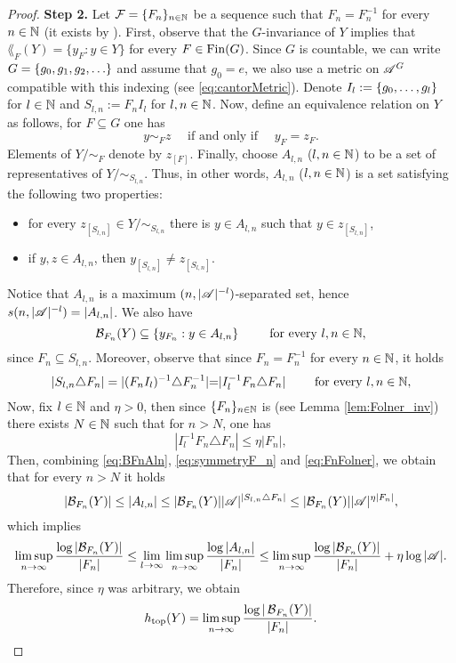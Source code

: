 \begin{proof}
\noindent
{\bf Step 2.}
Let $\operatorname{\mathcal{F}}= \{F_n\}_{n\in\mathbb{N}}$ be a \Folner sequence such that $F_n = F_n^{-1}$ for every $n\in\mathbb{N}$ (it exists by \cite{Namioka64}).
First, observe that the $G$-invariance of $Y$ implies that $\lang_{F}(Y)=\{y_{F}:y\in Y\}$ for every $F\in\operatorname{Fin}(G)$. 
Since $G$ is countable, we can write $G=\left\{g_0,g_1,g_2,\ldots\right\}$ and assume that $g_0=e$, we also use a metric on $\mathscr{A}^G$ compatible with this indexing (see \eqref{eq:cantorMetric}). Denote $I_l:=\left\{g_0,\ldots, g_l\right\}$ for $l\in\mathbb{N}$ and $S_{l,n} := F_nI_l$ for $l,n\in\mathbb{N}$. %
Now, define an equivalence relation on $Y$ as follows, for $F\subseteq G$ one has
\[
y\sim_F z \quad\text{ if and only if }\quad y_{F} = z_{F}.
\]
Elements of $Y/\sim_{F}$ denote by $z_{[F]}$. Finally, choose $A_{l,n}$ ($l,n\in\mathbb{N}$) to be a set of representatives of $Y/\sim_{S_{l,n}}$. Thus, in other words, $A_{l,n}$ ($l,n\in\mathbb{N}$) is a set satisfying the following two properties:
\begin{itemize}
\item for every $z_{[S_{l,n}]}\in Y/\sim_{S_{l,n}}$ there is $y\in A_{l,n}$ such that $y\in z_{[S_{l,n}]}$,
\item if $y,z\in A_{l,n}$, then $y_{[S_{l,n}]}\neq z_{[S_{l,n}]}$.
\end{itemize}
Notice that $A_{l,n}$ is a maximum $(n,|\mathscr{A}|^{-l})$-separated set, hence $s(n,|\mathscr{A}|^{-l}) = |A_{l,n}|$. We also have 
\begin{equation}\label{eq:BFnAln}
\mathcal B_{F_n}(Y) \subseteq \left\{y_{F_n}:y\in A_{l,n}\right\} ~~~~~~\text{ for every }l,n\in\mathbb{N},
\end{equation}
since $F_n\subseteq S_{l,n}$. Moreover, observe that since $F_n=F_n^{-1}$ for every $n\in\mathbb{N}$, it holds
\begin{equation}\label{eq:symmetryF_n}
|S_{l,n}\triangle F_n| = |(F_nI_l)^{-1}\triangle F_n^{-1}| {=}|I_l^{-1}F_n\triangle F_n|~~~~~~\text{ for every }l,n\in\mathbb{N},
\end{equation}
Now, fix $l\in\mathbb{N}$ and $\eta>0$, then since $\{F_n\}_{n\in\mathbb{N}}$ is \Folner (see Lemma \ref{lem:Folner_inv}) there exists $N\in\mathbb{N}$ such that for $n>N$, one has
\begin{equation}\label{eq:FnFolner}
|I_l^{-1}F_n\triangle F_n|{\leq} \eta|F_n|,
\end{equation}
Then, combining \eqref{eq:BFnAln}, \eqref{eq:symmetryF_n} and \eqref{eq:FnFolner}, we obtain that for every $n>N$ it holds
\[
|\mathcal B_{F_n}(Y)|\leq |A_{l,n}|\leq |\mathcal B_{F_n}(Y)||\mathscr{A}|^{|S_{l,n}\triangle F_n|}\leq |\mathcal B_{F_n}(Y)||\mathscr{A}|^{\eta|F_n|},
\]
which implies
\[
\limsup_{n\to\infty}\frac{\log|\mathcal B_{F_n}(Y)|}{|F_n|}\leq\lim_{l\to\infty}\limsup_{n\to\infty} \frac{\log|A_{l,n}|}{|F_n|}\leq \limsup_{n\to\infty}\frac{\log|\mathcal B_{F_n}(Y)|}{|F_n|} + \eta\log|\mathscr{A}|.
\]
Therefore, since $\eta$ was arbitrary, we obtain
\[
h_\mathrm{top}(Y)=\limsup_{n\to\infty}\frac{\log|\operatorname{\mathcal{B}}_{F_n}(Y)|}{|F_n|}. \qedhere
\]
\end{proof}

